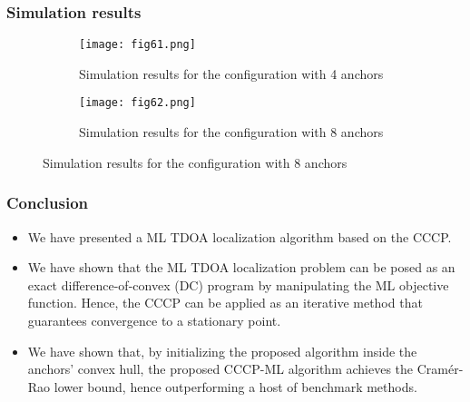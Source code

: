 \documentclass{beamer}
\begin{document}
\begin{frame}
\frametitle{Simulation results}
    \begin{figure}
    \centering
    \begin{subfigure}[b!]{0.45\linewidth}
    \centering
    \texttt{[image: fig61.png]}
    \caption{Simulation results for the configuration with 4 anchors} 
    \label{fig:img61}
    \end{subfigure}
    \begin{subfigure}[b!]{0.45\linewidth}
    \centering
    \texttt{[image: fig62.png]}
    \caption{Simulation results for the configuration with 8 anchors}
    \label{fig:img62}
    \end{subfigure}
\end{figure}
\end{frame}

\begin{frame}
\frametitle{Conclusion}
    \begin{itemize}
        \item We have presented a ML TDOA localization algorithm based on the CCCP. 
        \item We have shown that the ML TDOA localization problem can be posed as an exact difference-of-convex (DC) program by manipulating the ML objective function. Hence, the CCCP can be applied as an iterative method that guarantees convergence to a stationary point.
        \item  We have shown that, by initializing the proposed algorithm inside the anchors’ convex hull, the proposed CCCP-ML algorithm achieves the Cramér-Rao lower bound, hence outperforming a host of benchmark methods.

    \end{itemize}
\end{frame}
\end{document}
